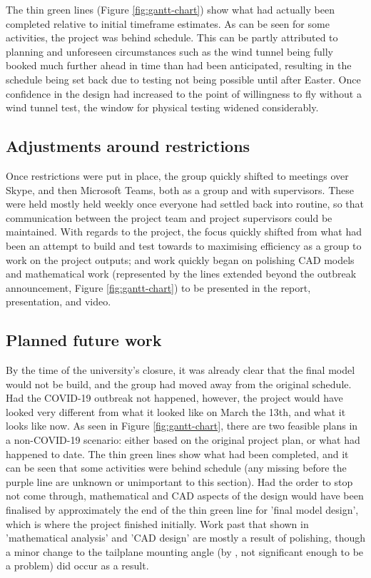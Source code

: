 \documentclass[../../main.tex]{subfiles}
\begin{document}
The thin green lines (Figure \ref{fig:gantt-chart}) show what had actually been completed relative to initial timeframe estimates.
As can be seen for some activities, the project was behind schedule.
This can be partly attributed to planning and unforeseen circumstances such as the wind tunnel being fully booked much further ahead in time than had been anticipated, resulting in the schedule being set back due to testing not being possible until after Easter.
Once confidence in the design had increased to the point of willingness to fly without a wind tunnel test, the window for physical testing widened considerably. 

\subsection{Adjustments around restrictions} \label{sec:project-review:impact-of-covid-19:adjustments-around-restrictions}

Once restrictions were put in place, the group quickly shifted to meetings over Skype, and then Microsoft Teams, both as a group and with supervisors.
These were held mostly held weekly once everyone had settled back into routine, so that communication between the project team and project supervisors could be maintained.
With regards to the project, the focus quickly shifted from what had been an attempt to build and test towards to maximising efficiency as a group to work on the project outputs; and work quickly began on polishing CAD models and mathematical work (represented by the lines extended beyond the outbreak announcement, Figure \ref{fig:gantt-chart}) to be presented in the report, presentation, and video.

\subsection{Planned future work} \label{sec:project-review:planned-future-work}

By the time of the university's closure, it was already clear that the final model would not be build, and the group had moved away from the original schedule.
Had the COVID-19 outbreak not happened, however, the project would have looked very different from what it looked like on March the 13th, and what it looks like now.
As seen in Figure \ref{fig:gantt-chart}, there are two feasible plans in a non-COVID-19 scenario: either based on the original project plan, or what had happened to date.
The thin green lines show what had been completed, and it can be seen that some activities were behind schedule (any missing before the purple line are unknown or unimportant to this section).
Had the order to stop not come through, mathematical and CAD aspects of the design would have been finalised by approximately the end of the thin green line for 'final model design', which is where the project finished initially.
Work past that shown in 'mathematical analysis' and 'CAD design' are mostly a result of polishing, though a minor change to the tailplane mounting angle (by , not significant enough to be a problem) did occur as a result.  
\end{document}
